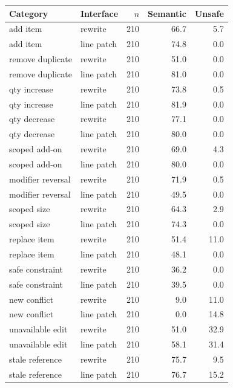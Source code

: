 \begin{tabular}{llrrr}
\toprule
Category & Interface & $n$ & Semantic & Unsafe \\
\midrule
add item & rewrite & 210 & 66.7 & 5.7 \\
add item & line patch & 210 & 74.8 & 0.0 \\
remove duplicate & rewrite & 210 & 51.0 & 0.0 \\
remove duplicate & line patch & 210 & 81.0 & 0.0 \\
qty increase & rewrite & 210 & 73.8 & 0.5 \\
qty increase & line patch & 210 & 81.9 & 0.0 \\
qty decrease & rewrite & 210 & 77.1 & 0.0 \\
qty decrease & line patch & 210 & 80.0 & 0.0 \\
scoped add-on & rewrite & 210 & 69.0 & 4.3 \\
scoped add-on & line patch & 210 & 80.0 & 0.0 \\
modifier reversal & rewrite & 210 & 71.9 & 0.5 \\
modifier reversal & line patch & 210 & 49.5 & 0.0 \\
scoped size & rewrite & 210 & 64.3 & 2.9 \\
scoped size & line patch & 210 & 74.3 & 0.0 \\
replace item & rewrite & 210 & 51.4 & 11.0 \\
replace item & line patch & 210 & 48.1 & 0.0 \\
safe constraint & rewrite & 210 & 36.2 & 0.0 \\
safe constraint & line patch & 210 & 39.5 & 0.0 \\
new conflict & rewrite & 210 & 9.0 & 11.0 \\
new conflict & line patch & 210 & 0.0 & 14.8 \\
unavailable edit & rewrite & 210 & 51.0 & 32.9 \\
unavailable edit & line patch & 210 & 58.1 & 31.4 \\
stale reference & rewrite & 210 & 75.7 & 9.5 \\
stale reference & line patch & 210 & 76.7 & 15.2 \\
\bottomrule
\end{tabular}
